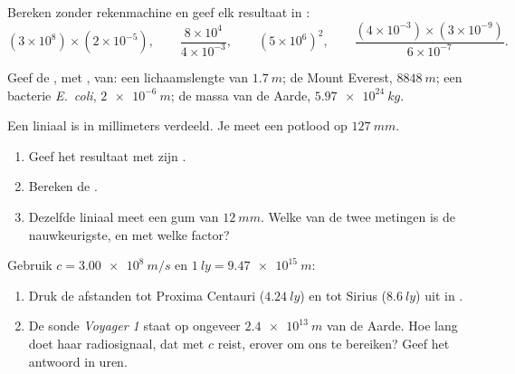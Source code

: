 \begin{exercise}[$\star$]\label{exo:g10:orders-of-magnitude:3}
Bereken zonder rekenmachine en geef elk resultaat in :
\[
(3\times10^{8})\times(2\times10^{-5}), \qquad
\frac{8\times10^{4}}{4\times10^{-3}}, \qquad
(5\times10^{6})^{2}, \qquad
\frac{(4\times10^{-3})\times(3\times10^{-9})}{6\times10^{-7}} .
\]
\end{exercise}

\begin{exercise}[$\star$]\label{exo:g10:orders-of-magnitude:4}
Geef de , met , van: een lichaamslengte van
$\qty{1.7}{m}$; de Mount Everest, $\qty{8848}{m}$; een bacterie
\emph{E.~coli}, $\qty{2e-6}{m}$; de massa van de Aarde,
$\qty{5.97e24}{kg}$.
\end{exercise}

\begin{exercise}[$\star$]\label{exo:g10:orders-of-magnitude:5}
Een liniaal is in millimeters verdeeld. Je meet een potlood op
$\qty{127}{mm}$.
\begin{enumerate}
  \item Geef het resultaat met zijn .
  \item Bereken de .
  \item Dezelfde liniaal meet een gum van $\qty{12}{mm}$. Welke van de
        twee metingen is de nauwkeurigste, en met welke factor?
\end{enumerate}
\end{exercise}

\begin{exercise}[$\star\star$]\label{exo:g10:orders-of-magnitude:6}
Gebruik $c = \qty{3.00e8}{m/s}$ en $\qty{1}{ly} = \qty{9.47e15}{m}$:
\begin{enumerate}
  \item Druk de afstanden tot Proxima Centauri ($\qty{4.24}{ly}$) en
        tot Sirius ($\qty{8.6}{ly}$) uit in .
  \item De sonde \emph{Voyager 1} staat op ongeveer $\qty{2.4e13}{m}$
        van de Aarde. Hoe lang doet haar radiosignaal, dat met $c$
        reist, erover om ons te bereiken? Geef het antwoord in uren.
\end{enumerate}
\end{exercise}

